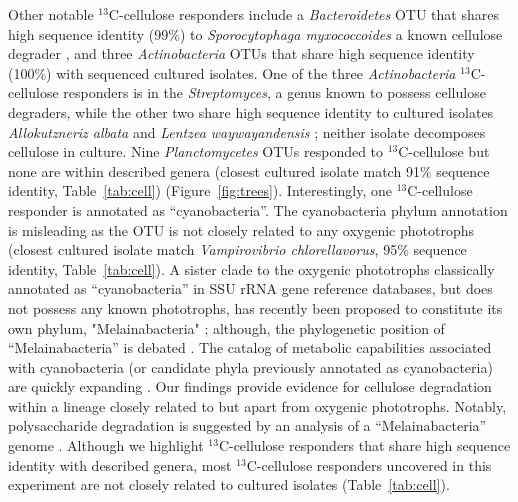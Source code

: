 Other notable $^{13}$C-cellulose responders include a \textit{Bacteroidetes}
OTU that shares high sequence identity (99\%) to \textit{Sporocytophaga
myxococcoides} a known cellulose degrader \citep{Vance_1980}, and three
\textit{Actinobacteria} OTUs that share high sequence identity (100\%) with
sequenced cultured isolates. One of the three \textit{Actinobacteria}
$^{13}$C-cellulose responders is in the \textit{Streptomyces}, a genus known to
possess cellulose degraders, while the other two share high sequence identity
to cultured isolates \textit{Allokutzneriz albata} \citep{Labeda_2008,
Tomita_1993} and \textit{Lentzea waywayandensis} \citep{LABEDA_1989,Labeda_2001}; 
neither isolate decomposes cellulose in culture. Nine
\textit{Planctomycetes} OTUs responded to $^{13}$C-cellulose but none are within
described genera (closest cultured isolate match 91\% sequence identity,
Table~\ref{tab:cell}) (Figure~\ref{fig:trees}). Interestingly, one
$^{13}$C-cellulose responder is annotated as ``cyanobacteria''.
The cyanobacteria phylum annotation is misleading as the OTU is not closely
related to any oxygenic phototrophs (closest cultured isolate match
\textit{Vampirovibrio chlorellavorus}, 95\% sequence identity,
Table~\ref{tab:cell}). A sister clade to the oxygenic phototrophs classically
annotated as ``cyanobacteria'' in SSU rRNA gene reference databases, but does
not possess any known phototrophs, has recently been proposed to constitute its own
phylum, "Melainabacteria" \citet{Di_Rienzi_2013}; although, the phylogenetic
position of ``Melainabacteria'' is debated \citep{Soo_2014}. The catalog of
metabolic capabilities associated with cyanobacteria (or candidate phyla
previously annotated as cyanobacteria) are quickly expanding
\citep{Di_Rienzi_2013, Soo_2014}. Our findings provide evidence for cellulose
degradation within a lineage closely related to but apart from oxygenic
phototrophs. Notably, polysaccharide degradation is suggested by an analysis of
a ``Melainabacteria'' genome \citep{Di_Rienzi_2013}. Although we highlight
$^{13}$C-cellulose responders that share high sequence identity with described
genera, most $^{13}$C-cellulose responders uncovered in this experiment are not
closely related to cultured isolates (Table~\ref{tab:cell}).

